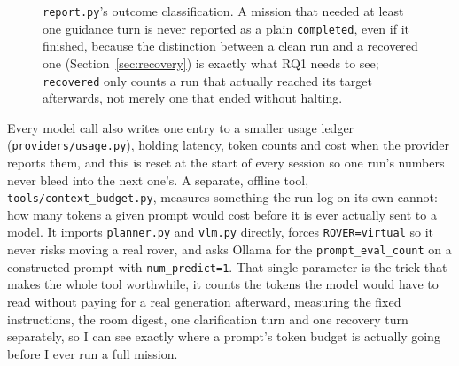 \begin{figure}[htbp]
  \centering
  \caption{\texttt{report.py}'s outcome classification. A mission that needed at least one guidance turn is never reported as a plain \texttt{completed}, even if it finished, because the distinction between a clean run and a recovered one (Section~\ref{sec:recovery}) is exactly what RQ1 needs to see; \texttt{recovered} only counts a run that actually reached its target afterwards, not merely one that ended without halting.}
  \label{fig:flow-outcome}
\end{figure}

Every model call also writes one entry to a smaller usage ledger
(\texttt{providers/usage.py}), holding latency, token counts and cost when
the provider reports them, and this is reset at the start of every session
so one run's numbers never bleed into the next one's. A separate, offline
tool, \texttt{tools/context\_budget.py}, measures something the run log on
its own cannot: how many tokens a given prompt would cost before it is
ever actually sent to a model. It imports \texttt{planner.py} and
\texttt{vlm.py} directly, forces \texttt{ROVER=virtual} so it never risks
moving a real rover, and asks Ollama for the \texttt{prompt\_eval\_count} on
a constructed prompt with \texttt{num\_predict=1}. That single parameter is
the trick that makes the whole tool worthwhile, it counts the tokens the
model would have to read without paying for a real generation afterward,
measuring the fixed instructions, the room digest, one clarification turn
and one recovery turn separately, so I can see exactly where a prompt's
token budget is actually going before I ever run a full mission.
